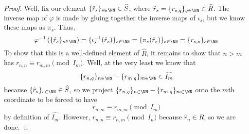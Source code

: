 \begin{proof}
	Well, fix our element $\{\hat r_s\}_{s\in\NN}\in\widehat S$, where $\hat r_s=\{r_{s,q}\}_{q\in\NN}\in\widehat R$. The inverse map of $\varphi$ is made by gluing together the inverse maps of $\iota_s$, but we know these maps as $\pi_s$. Thus,
	\[\varphi^{-1}\left(\{\hat r_s\}_{s\in\NN}\right)=\{\iota_s^{-1}(\hat r_s)\}_{s\in\NN}=\{\pi_s(\hat r_s)\}_{s\in\NN}=\{r_{s,s}\}_{s\in\NN}\]
	To show that this is a well-defined element of $\widehat R$, it remains to show that $n>m$ has $r_{n,n}\equiv r_{m,m}\pmod{I_m}$. Well, at the very least we know that
	\[\{r_{n,q}\}_{n\in\NN}-\{r_{m,q}\}_{m\in\NN}\in\widehat{I_m}\]
	because $\{\hat r_s\}_{s\in\NN}\in\widehat S$, so we project $\{r_{n,q}\}_{n\in\NN}-\{r_{m,q}\}_{m\in\NN}$ onto the $m$th coordinate to be forced to have
	\[r_{n,m}\equiv r_{m,m}\pmod{I_m}\]
	by definition of $\widehat{I_m}$. However, $r_{n,n}\equiv r_{n,m}\pmod{I_n}$ because $\hat r_n\in\widehat R$, so we are done.
\end{proof}


